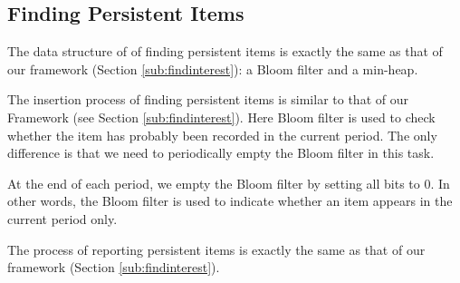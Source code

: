 \vvv\vvv\vvv
\presec
\subsection{Finding Persistent Items} \postsec
\label{sec:basicAlgorithm:persistent}

{\color{reviewD}
The data structure of \aname{} of finding persistent items is exactly the same as that of our framework (Section \ref{sub:findinterest}): a Bloom filter and a min-heap. 
}


{\color{reviewD}
The insertion process of finding persistent items is similar to that of our Framework (see Section \ref{sub:findinterest}).
Here Bloom filter is used to check whether the item has probably been recorded in the current period.
The only difference is that we need to periodically empty the Bloom filter in this task.
%
}


At the end of each period, we empty the Bloom filter by setting all bits to 0. In other words, the Bloom filter is used to indicate whether an item appears in the current period only.


{\color{reviewD}
The process of reporting persistent items is exactly the same as that of our framework (Section \ref{sub:findinterest}).
}

